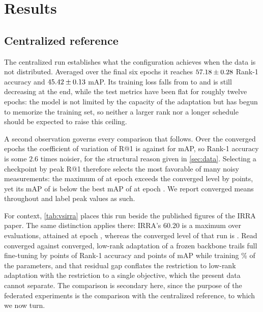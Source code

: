\section{Results}\label{sec:results}

\subsection{Centralized reference}\label{sec:ceiling}

The centralized run establishes what the configuration achieves when the data is not distributed. Averaged over the final six epochs it reaches $57.18\pm0.28$ Rank-1 accuracy and $45.42\pm0.13$ mAP. Its training loss falls from \numCFirstLoss{} to \numCFinalLoss{} and is still decreasing at the end, while the test metrics have been flat for roughly twelve epochs: the model is not limited by the capacity of the adaptation but has begun to memorize the training set, so neither a larger rank nor a longer schedule should be expected to raise this ceiling.

A second observation governs every comparison that follows. Over the converged epochs the coefficient of variation of R@1 is \numCVR{} against \numCVM{} for mAP, so Rank-1 accuracy is some $2.6$ times noisier, for the structural reason given in \cref{sec:data}. Selecting a checkpoint by peak R@1 therefore selects the most favorable of many noisy measurements: the maximum of \numCBestR{} at epoch \numCBestRround{} exceeds the converged level by \numCOverR{} points, yet its mAP of \numCBestRmAP{} is below the best mAP of \numCBestM{} at epoch \numCBestMround{}. We report converged means throughout and label peak values as such.

For context, \cref{tab:vsirra} places this run beside the published figures of the IRRA paper. The same distinction applies there: IRRA's $60.20$ is a maximum over \numIrraNEval{} evaluations, attained at epoch \numIrraBestEp{}, whereas the converged level of that run is \numIrraConvR{}. Read converged against converged, low-rank adaptation of a frozen backbone trails full fine-tuning by \numGapIrraConvR{} points of Rank-1 accuracy and \numGapIrraConvM{} points of mAP while training \numTrainPct\% of the parameters, and that residual gap conflates the restriction to low-rank adaptation with the restriction to a single objective, which the present data cannot separate. The comparison is secondary here, since the purpose of the federated experiments is the comparison with the centralized reference, to which we now turn.

